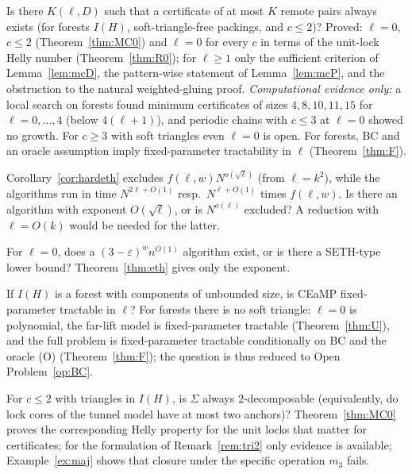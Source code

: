 \begin{problem}\label{op:BC}\label{op:mincert}
Is there $K(\ell,D)$ such that a certificate of at most $K$ remote pairs always exists (for forests $I(H)$, soft-triangle-free packings, and $c\le2$)? Proved: $\ell=0$, $c\le2$ (Theorem~\ref{thm:MC0}) and $\ell=0$ for every $c$ in terms of the unit-lock Helly number (Theorem~\ref{thm:R0}); for $\ell\ge1$ only the sufficient criterion of Lemma~\ref{lem:mcD}, the pattern-wise statement of Lemma~\ref{lem:mcP}, and the obstruction to the natural weighted-gluing proof. \emph{Computational evidence only:} a local search on forests found minimum certificates of sizes $4,8,10,11,15$ for $\ell=0,\dots,4$ (below $4(\ell+1)$), and periodic chains with $c\le3$ at $\ell=0$ showed no growth. For $c\ge3$ with soft triangles even $\ell=0$ is open. For forests, BC and an oracle assumption imply fixed-parameter tractability in $\ell$ (Theorem~\ref{thm:F}).
\end{problem}
\begin{problem}\label{op:eth}\sloppy
Corollary~\ref{cor:hardeth} excludes $f(\ell,w)N^{o(\sqrt\ell)}$ (from $\ell=k^2$), while the algorithms run in time $N^{2\ell+O(1)}$ resp.\ $N^{\ell+O(1)}$ times $f(\ell,w)$. Is there an algorithm with exponent $O(\sqrt\ell)$, or is $N^{o(\ell)}$ excluded? A reduction with $\ell=O(k)$ would be needed for the latter.
\end{problem}
\begin{problem}\label{op:seth}
For $\ell=0$, does a $(3-\varepsilon)^{w}n^{O(1)}$ algorithm exist, or is there a SETH-type lower bound? Theorem~\ref{thm:eth} gives only the exponent.
\end{problem}
\begin{problem}[$w=1$ with unbounded tree components]\label{op:forest}
If $I(H)$ is a forest with components of unbounded size, is CEaMP fixed-parameter tractable in $\ell$? For forests there is no soft triangle: $\ell=0$ is polynomial, the far-lift model is fixed-parameter tractable (Theorem~\ref{thm:U}), and the full problem is fixed-parameter tractable conditionally on BC and the oracle (O) (Theorem~\ref{thm:F}); the question is thus reduced to Open Problem~\ref{op:BC}.
\end{problem}
\begin{problem}\label{op:tri2}
For $c\le2$ with triangles in $I(H)$, is $\Sigma$ always $2$-decomposable (equivalently, do lock cores of the tunnel model have at most two anchors)? Theorem~\ref{thm:MC0} proves the corresponding Helly property for the unit locks that matter for certificates; for the formulation of Remark~\ref{rem:tri2} only evidence is available; Example~\ref{ex:maj} shows that closure under the specific operation $m_3$ fails.
\end{problem}
